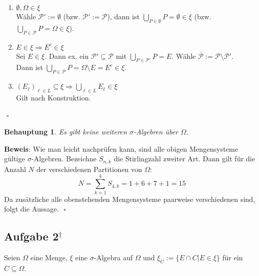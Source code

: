 \documentclass[11pt,a4paper,ngerman]{article}
\newcommand{\set}[1]{ \{ #1 \}}
\newtheorem{prop}{\bfseries Behauptung}
\begin{document}
\begin{enumerate}[(i)]
\begin{enumerate}[(1)]
\item $\emptyset, \Omega \in \xi$ \\
Wähle $\mathcal{P'} := \emptyset$ (bzw. $\mathcal{P'} := \mathcal{P}$), dann ist $\bigcup_{P \in \emptyset} P = \emptyset \in \xi$ (bzw. $\bigcup_{P \in \mathcal{P}} P = \Omega \in \xi$).

\item $E \in \xi \Rightarrow E^c \in \xi$ \\
Sei $E \in \xi$. Dann ex. ein $\mathcal{P'} \subseteq \mathcal{P}$ mit $\bigcup_{P \in \mathcal{P'}} P = E$. Wähle $\overline{\mathcal{P}} := \mathcal{P} \setminus \mathcal{P'}$.\\
Dann ist $\bigcup_{P \in \overline{\mathcal{P}}} P = \Omega \setminus E = E^c \in \xi$.

\item $\left( E_\ell \right)_{\ell \in L} \subseteq \xi \Rightarrow \bigcup_{\ell \in L} E_\ell \in \xi$ \\
Gilt nach Konstruktion.
\end{enumerate}
\end{enumerate}

 $\mbox{}$ \hfill $\square$

\begin{prop}
 Es gibt keine weiteren $\sigma$-Algebren über $\Omega$. 
\end{prop}
\textbf{Beweis}: Wie man leicht nachprüfen kann, sind alle obigen Mengensysteme gültige $\sigma$-Algebren. Bezeichne $S_{n,k}$ die Stirlingzahl zweiter Art.
Dann gilt für die Anzahl $N$ der verschiedenen Partitionen von $\Omega$: 
\begin{equation}
N = \sum_{k=1}^4 S_{4,k} = 1 +6+ 7+ 1=15
\end{equation}
Da zusätzliche alle obenstehenden Mengensysteme paarweise verschiedenen sind, folgt die Aussage.
$\mbox{}$ \hfill $\square$

\subsection*{Aufgabe 2$^\dagger$}
Seien $\Omega$ eine Menge, $\xi$ eine $\sigma$-Algebra auf $\Omega$ und $\xi_C := \set{E \cap C | E \in \xi}$ für ein $C \subseteq \Omega$.
\end{document}
